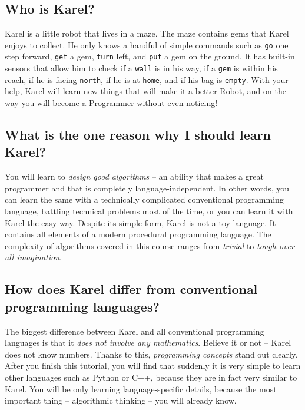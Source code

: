 \documentclass[article,A4,12pt]{llncs}
\begin{document}
\subsection{Who is Karel?}

Karel is a little robot that lives in a maze. The maze contains gems that Karel enjoys to collect. 
He only knows a handful of simple commands such as {\tt go} one step forward, {\tt get} a gem, 
{\tt turn} left, and {\tt put} a gem on the ground. It has built-in sensors that allow him to 
check if a {\tt wall} is in his way, if a {\tt gem} is within his reach, if he is facing {\tt north}, 
if he is at {\tt home}, and if his bag is {\tt empty}. With your help, Karel will learn new things 
that will make it a better Robot, and on the way you will become a Programmer without even noticing! 

\subsection{What is the one reason why I should learn Karel?}

You will learn to {\em design good algorithms} -- an ability that makes
a great programmer and that is completely language-independent. In other 
words, you can learn the same with a technically complicated conventional 
programming language, battling technical problems most of the time,
or you can learn it with Karel the easy way.
Despite its simple form, Karel is not a toy language. It contains all elements 
of a modern procedural programming language. The complexity of algorithms 
covered in this course ranges from {\em trivial} to {\em tough over 
all imagination}.

\subsection{How does Karel differ from conventional programming languages?}

The biggest difference between Karel and all conventional 
programming languages is that it {\em does not involve any mathematics}.
Believe it or not -- Karel does not know numbers. Thanks 
to this, {\em programming concepts} stand out clearly. 
After you finish this tutorial, you will find that suddenly it is very simple 
to learn other languages such as Python or C++, because they are in fact 
very similar to Karel. You will be only learning language-specific details, 
because the most important thing -- algorithmic thinking -- you will already 
know.
 
\end{document}

